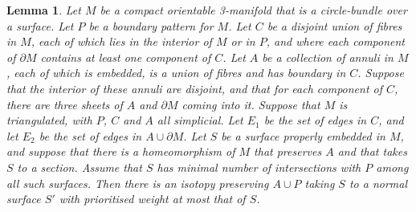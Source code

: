 \documentclass[oneside]{amsart}
\numberwithin{equation}{section}
\theoremstyle{plain}
\newtheorem{lemma}[equation]{Lemma}
\theoremstyle{definition}
\begin{document}
\begin{lemma}
\label{Lem:NormalisePrioritisedWeight}
Let $M$ be a compact orientable 3-manifold that is a circle-bundle over a surface. 
Let $P$ be a boundary pattern for $M$. 
Let $C$ be a disjoint union of fibres in $M$, each of which lies in the interior of $M$ or in $P$,
and where each component of $\partial M$ contains at least one component of $C$.
Let $A$ be a collection of annuli in $M$, each of which is embedded, is a union of fibres and has boundary in $C$. 
Suppose that the interior of these annuli are disjoint,
and that for each component of $C$, there are three sheets of $A$ and $\partial M$ coming into it. 
Suppose that $M$ is triangulated, with $P$, $C$ and $A$ all simplicial.
 Let $E_1$ be the set of edges in $C$,
and let $E_2$ be the set of edges in $A \cup \partial M$. 
Let $S$ be a surface properly embedded in $M$, and suppose that there is a homeomorphism of $M$
that preserves $A$ and that takes $S$ to a section. 
Assume that $S$ has minimal number of intersections with $P$ among all such surfaces.
Then there is an isotopy preserving $A \cup P$ taking $S$ to a normal surface $S'$ with prioritised weight at most that of $S$.
\end{lemma}
\end{document}
